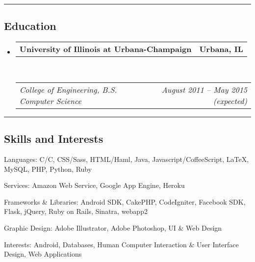 \documentclass[10pt,letterpaper]{article}
\makeatletter
\newcommand{\headerrow}[2]
{\begin{tabular*}{\linewidth}{l@{\extracolsep{\fill}}r}
	#1 &
	#2 \\
\end{tabular*}}
\newcommand{\CPP}
{C\nolinebreak[4]\hspace{-.05em}\raisebox{.22ex}{\footnotesize\bf ++}}
\makeatother
\begin{document}
\hrule
\vspace{-0.4em}
\subsection*{Education}

\begin{itemize}
	\parskip=0.1em

	\item 
	\headerrow
		{\textbf{University of Illinois at Urbana-Champaign}}
		{\textbf{Urbana, IL}}
	\\
	\headerrow
		{\emph{College of Engineering, B.S. Computer Science}}
		{\emph{August 2011 -- May 2015 (expected)}}

\end{itemize}


\hrule
\vspace{-0.4em}
\subsection*{Skills and Interests}

\begin{description*}
	\item[Languages:]
       C/\CPP, CSS/Sass, HTML/Haml, Java, Javascript/CoffeeScript, \LaTeX, MySQL, PHP, Python, Ruby
	\item[Services:]
	Amazon Web Service, Google App Engine, Heroku
	\item[Frameworks & Libraries:]
	Android SDK, CakePHP, CodeIgniter, Facebook SDK, Flask, jQuery, Ruby on Rails, Sinatra, webapp2
	\item[Graphic Design:]
	Adobe Illustrator, Adobe Photoshop, UI \& Web Design
	\item[Interests:]
	Android, Databases, Human Computer Interaction \& User Interface Design, Web 
	Applications
\end{description*}
\end{document}
